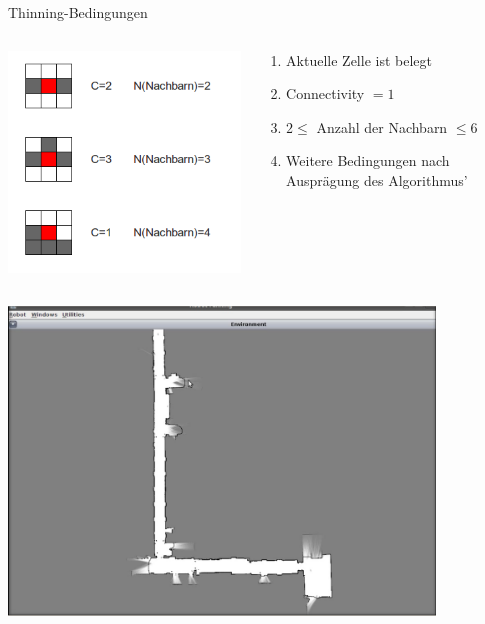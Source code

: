 \begin{frame}{Thinning-Bedingungen}

\begin{columns}\begin{column}[l]{0.4\textwidth}

\includegraphics[width=1.0\textwidth]{./material/thinning2.png}

\end{column}\begin{column}[r]{0.6\textwidth}
 
 \begin{enumerate}
  \item Aktuelle Zelle ist belegt
  \item Connectivity $ = 1$
  \item $2 \leq $ Anzahl der Nachbarn $ \leq 6$
  \item Weitere Bedingungen nach Ausprägung des Algorithmus'
 \end{enumerate}
 
\end{column}\end{columns}
 
\end{frame}

\begin{frame}
 \centering
 \includegraphics[width=0.85\textwidth]{./material/screencast.png}
\end{frame}

